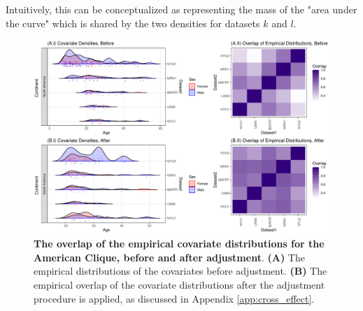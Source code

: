 {Intuitively, this can be conceptualized as representing the mass of the "area under the curve" which is shared by the two densities for datasets $k$ and $l$.

\begin{figure}[h!]
    \centering
    \includegraphics[width=\linewidth]{Figures/Supplement/ov_app.pdf}
    \caption{\textbf{The overlap of the empirical covariate distributions for the American Clique, before and after adjustment}. \textbf{(A)} The empirical distributions of the covariates before adjustment. \textbf{(B)} The empirical overlap of the covariate distributions after the adjustment procedure is applied, as discussed in Appendix \ref{app:cross_effect}.}
    \label{fig:overlap}
\end{figure}

}
